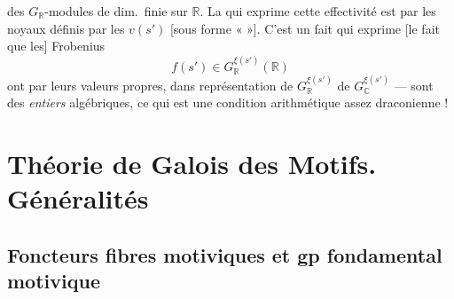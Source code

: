 
des $G_{\mathbb{R}}$-modules de dim.\ finie sur $\mathbb{R}$. La
 qui exprime cette effectivité est 
par les  noyaux définis par les $v(s')$ [sous forme
«  »]. C'est un fait qui exprime [le fait que les]
Frobenius
\[
  f(s') \in G_{\mathbb{R}}^{\xi(s')}(\mathbb{R})
\]
ont \ill{} par leurs valeurs propres, dans \ill{} représentation \ill{} de
$G_{\mathbb{R}}^{\xi(s')}$  \ill{} \ill{} de
$G_{\mathbb{C}}^{\xi(s')}$ --- sont des \emph{entiers} algébriques, ce qui
est une condition arithmétique assez draconienne !

\section{Théorie de Galois des Motifs. Généralités}


\subsection*{Foncteurs fibres motiviques et gp fondamental motivique}


